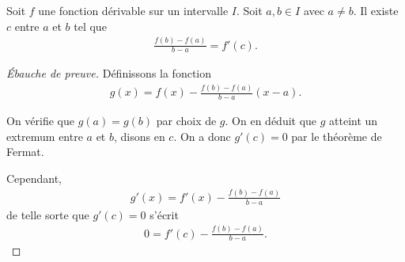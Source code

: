 \documentclass[main.tex]{subfiles}
\begin{document}
\begin{proposition}

    Soit $f$ une fonction dérivable sur un intervalle $I$.
    Soit $a,b \in I$ avec $a \neq b$.
    Il existe $c$ entre $a$ et $b$ tel que
    \begin{align}
        \frac {f(b) - f(a)} {b - a} = f'(c).
    \end{align}
\end{proposition}
\begin{proof}[Ébauche de preuve]
    Définissons la fonction
    \begin{align}
        g(x) = f(x) - \frac {f(b) - f(a)} {b - a} (x - a).
    \end{align}

    On vérifie que $g(a) = g(b)$ par choix de $g$.
    On en déduit que $g$ atteint un extremum entre $a$ et $b$,
    disons en $c$.
    On a donc $g'(c) = 0$ par le théorème de Fermat.

    Cependant,
    \begin{align}
        g'(x) = f'(x) - \frac {f(b) - f(a)} {b - a}
    \end{align}
    de telle sorte que $g'(c) = 0$ s'écrit
    \begin{align}
        0 = f'(c) - \frac {f(b) - f(a)} {b - a}.
    \end{align}
\end{proof}
\end{document}
